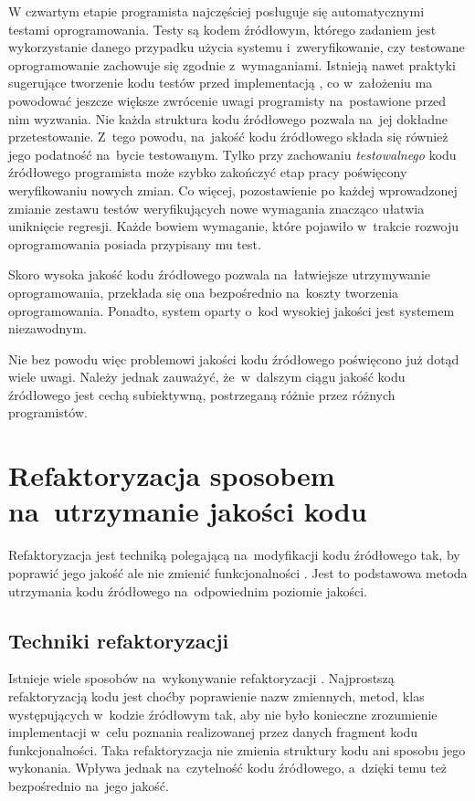 \documentclass[twoside]{praca}
\begin{document}
W czwartym etapie programista najczęściej posługuje się automatycznymi testami oprogramowania. Testy są kodem źródłowym, którego zadaniem jest wykorzystanie danego przypadku użycia systemu i~zweryfikowanie, czy testowane oprogramowanie zachowuje się zgodnie z~wymaganiami. Istnieją nawet praktyki sugerujące tworzenie kodu testów przed implementacją \cite{beck2003test}, co w~założeniu ma powodować jeszcze większe zwrócenie uwagi programisty na~postawione przed nim wyzwania. Nie każda struktura kodu źródłowego pozwala na~jej dokładne przetestowanie. Z~tego powodu, na~jakość kodu źródłowego składa się również jego podatność na~bycie testowanym. Tylko przy zachowaniu \textit{testowalnego} kodu źródłowego programista może szybko zakończyć etap pracy poświęcony weryfikowaniu nowych zmian. Co więcej, pozostawienie po każdej wprowadzonej zmianie zestawu testów weryfikujących nowe wymagania znacząco ułatwia uniknięcie regresji. Każde bowiem wymaganie, które pojawiło w~trakcie rozwoju oprogramowania posiada przypisany mu test.

Skoro wysoka jakość kodu źródłowego pozwala na~łatwiejsze utrzymywanie oprogramowania, przekłada się ona bezpośrednio na~koszty tworzenia oprogramowania. Ponadto, system oparty o~kod wysokiej jakości jest systemem niezawodnym.

Nie bez powodu więc problemowi jakości kodu źródłowego poświęcono już dotąd wiele uwagi. Należy jednak zauważyć, że~w~dalszym ciągu jakość kodu źródłowego jest cechą subiektywną, postrzeganą różnie przez różnych programistów.

\section{Refaktoryzacja sposobem na~utrzymanie jakości kodu}

Refaktoryzacja jest techniką polegającą na~modyfikacji kodu źródłowego tak, by poprawić jego jakość ale nie zmienić funkcjonalności \cite{fowler2018refactoring}. Jest to podstawowa metoda utrzymania kodu źródłowego na~odpowiednim poziomie jakości.

\subsection{Techniki refaktoryzacji}

Istnieje wiele sposobów na~wykonywanie refaktoryzacji \cite{drozdz}. Najprostszą refaktoryzacją kodu jest choćby poprawienie nazw zmiennych, metod, klas występujących w~kodzie źródłowym tak, aby nie było konieczne zrozumienie implementacji w~celu poznania realizowanej przez danych fragment kodu funkcjonalności. Taka refaktoryzacja nie zmienia struktury kodu ani sposobu jego wykonania. Wpływa jednak na~czytelność kodu źródłowego, a~dzięki temu też bezpośrednio na~jego jakość.
\end{document}
